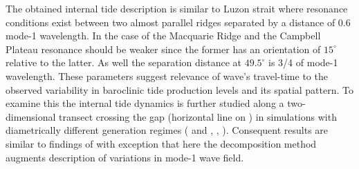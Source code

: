 \documentclass[12pt]{article}
\begin{document}
The obtained internal tide description is similar to Luzon strait where resonance conditions exist 
between two almost parallel ridges \citep{buijsman2012double, buijsman2014three} separated by a 
distance of 0.6 mode-1 wavelength. In the case of the Macquarie Ridge and the Campbell Plateau 
resonance should be weaker since the former has an orientation of $15^{\circ}$ relative to the 
latter. As well the separation distance at $49.5^{\circ}$ is 3/4 of mode-1 wavelength. These 
parameters suggest relevance of wave's travel-time to the observed variability in baroclinic tide 
production levels and its spatial pattern. To examine this the internal tide dynamics is further 
studied along a two-dimensional transect crossing the gap (horizontal line on 
) in simulations with diametrically different generation regimes ( 
and , , ). Consequent 
results are similar to findings of \citep{echeverri2010internal, buijsman2012double} with 
exception that here the decomposition method augments description of variations in mode-1 wave 
field.\\
\end{document}
